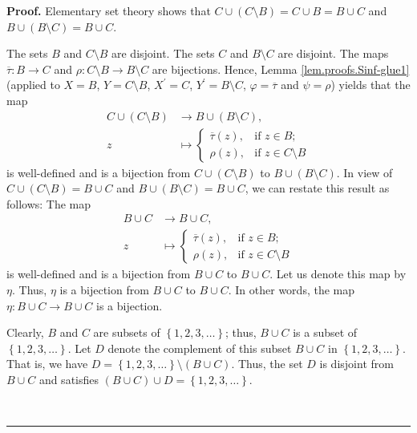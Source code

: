 \documentclass[numbers=enddot,12pt,final,onecolumn,notitlepage]{scrartcl}%
\theoremstyle{definition}
\newenvironment{proof}[1][Proof]{\noindent\textbf{#1.} }{\ \rule{0.5em}{0.5em}}
\newenvironment{verlong}{}{}
\begin{document}
\begin{verlong}
\begin{proof}
Elementary set theory shows that $C\cup\left(  C\setminus B\right)  =C\cup
B=B\cup C$ and $B\cup\left(  B\setminus C\right)  =B\cup C$.

The sets $B$ and $C\setminus B$ are disjoint. The sets $C$ and $B\setminus C$
are disjoint. The maps $\overline{\tau}:B\rightarrow C$ and $\rho:C\setminus
B\rightarrow B\setminus C$ are bijections. Hence, Lemma
\ref{lem.proofs.Sinf-glue1} (applied to $X=B$, $Y=C\setminus B$, $X^{\prime
}=C$, $Y^{\prime}=B\setminus C$, $\varphi=\overline{\tau}$ and $\psi=\rho$)
yields that the map%
\begin{align*}
C\cup\left(  C\setminus B\right)   &  \rightarrow B\cup\left(  B\setminus
C\right)  ,\\
z  &  \mapsto%
\begin{cases}
\overline{\tau}\left(  z\right)  , & \text{if }z\in B;\\
\rho\left(  z\right)  , & \text{if }z\in C\setminus B
\end{cases}
\end{align*}
is well-defined and is a bijection from $C\cup\left(  C\setminus B\right)  $
to $B\cup\left(  B\setminus C\right)  $. In view of $C\cup\left(  C\setminus
B\right)  =B\cup C$ and $B\cup\left(  B\setminus C\right)  =B\cup C$, we can
restate this result as follows: The map%
\begin{align*}
B\cup C  &  \rightarrow B\cup C,\\
z  &  \mapsto%
\begin{cases}
\overline{\tau}\left(  z\right)  , & \text{if }z\in B;\\
\rho\left(  z\right)  , & \text{if }z\in C\setminus B
\end{cases}
\end{align*}
is well-defined and is a bijection from $B\cup C$ to $B\cup C$. Let us denote
this map by $\eta$. Thus, $\eta$ is a bijection from $B\cup C$ to $B\cup C$.
In other words, the map $\eta:B\cup C\rightarrow B\cup C$ is a bijection.

Clearly, $B$ and $C$ are subsets of $\left\{  1,2,3,\ldots\right\}  $; thus,
$B\cup C$ is a subset of $\left\{  1,2,3,\ldots\right\}  $. Let $D$ denote the
complement of this subset $B\cup C$ in $\left\{  1,2,3,\ldots\right\}  $. That
is, we have $D=\left\{  1,2,3,\ldots\right\}  \setminus\left(  B\cup C\right)
$. Thus, the set $D$ is disjoint from $B\cup C$ and satisfies $\left(  B\cup
C\right)  \cup D=\left\{  1,2,3,\ldots\right\}  $.


\end{proof}
\end{verlong}
\end{document}
